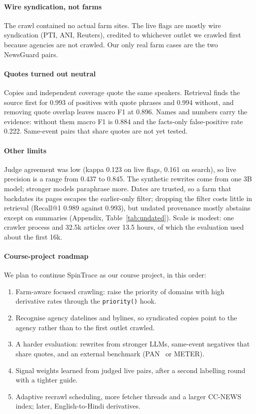 \documentclass[11pt,a4paper]{article}
\newcommand{\code}[1]{\texttt{#1}}
\begin{document}
\paragraph{Wire syndication, not farms} The crawl contained no actual farm sites. The live flags are mostly wire syndication (PTI, ANI, Reuters), credited to whichever outlet we crawled first because agencies are not crawled. Our only real farm cases are the two NewsGuard pairs.

\paragraph{Quotes turned out neutral} Copies and independent coverage quote the same speakers. Retrieval finds the source first for 0.993 of positives with quote phrases and 0.994 without, and removing quote overlap leaves macro F1 at 0.896. Names and numbers carry the evidence: without them macro F1 is 0.884 and the facts-only false-positive rate 0.222. Same-event pairs that share quotes are not yet tested.

\paragraph{Other limits} Judge agreement was low (kappa 0.123 on live flags, 0.161 on search), so live precision is a range from 0.437 to 0.845. The synthetic rewrites come from one 3B model; stronger models paraphrase more. Dates are trusted, so a farm that backdates its pages escapes the earlier-only filter; dropping the filter costs little in retrieval (Recall@1 0.989 against 0.993), but undated provenance mostly abstains except on summaries (Appendix, Table~\ref{tab:undated}). Scale is modest: one crawler process and 32.5k articles over 13.5 hours, of which the evaluation used about the first 16k.

\paragraph{Course-project roadmap} We plan to continue SpinTrace as our course project, in this order:
\begin{enumerate}
  \item Farm-aware focused crawling: raise the priority of domains with high derivative rates through the \code{priority()} hook.
  \item Recognise agency datelines and bylines, so syndicated copies point to the agency rather than to the first outlet crawled.
  \item A harder evaluation: rewrites from stronger LLMs, same-event negatives that share quotes, and an external benchmark (PAN~\cite{potthast2010} or METER).
  \item Signal weights learned from judged live pairs, after a second labelling round with a tighter guide.
  \item Adaptive recrawl scheduling, more fetcher threads and a larger CC-NEWS index; later, English-to-Hindi derivatives.
\end{enumerate}
\end{document}

